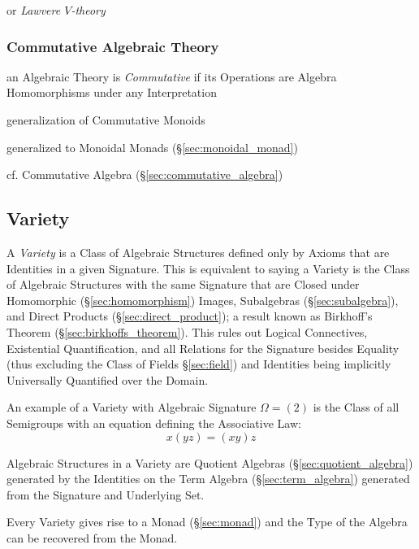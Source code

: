 or \emph{Lawvere $V$-theory}



\subsubsection{Commutative Algebraic Theory}
\label{sec:commutative_algebraic_theory}

an Algebraic Theory is \emph{Commutative} if its Operations are Algebra
Homomorphisms under any Interpretation

generalization of Commutative Monoids

generalized to Monoidal Monads (\S\ref{sec:monoidal_monad})

\fist cf. Commutative Algebra (\S\ref{sec:commutative_algebra})



\subsection{Variety}\label{sec:variety}

A \emph{Variety} is a Class of Algebraic Structures defined only by
Axioms that are Identities in a given Signature. This is equivalent to
saying a Variety is the Class of Algebraic Structures with the same
Signature that are Closed under Homomorphic (\S\ref{sec:homomorphism})
Images, Subalgebras (\S\ref{sec:subalgebra}), and Direct Products
(\S\ref{sec:direct_product}); a result known as Birkhoff's Theorem
(\S\ref{sec:birkhoffs_theorem}). This rules out Logical Connectives,
Existential Quantification, and all Relations for the Signature
besides Equality (thus excluding the Class of Fields
\S\ref{sec:field}) and Identities being implicitly Universally
Quantified over the Domain.

An example of a Variety with Algebraic Signature $\Omega = (2)$ is the
Class of all Semigroups with an equation defining the Associative Law:
\[
    x(yz) = (xy)z
\]

Algebraic Structures in a Variety are Quotient Algebras
(\S\ref{sec:quotient_algebra}) generated by the Identities on the Term
Algebra (\S\ref{sec:term_algebra}) generated from the Signature and
Underlying Set.

Every Variety gives rise to a Monad (\S\ref{sec:monad}) and the Type
of the Algebra can be recovered from the Monad.



